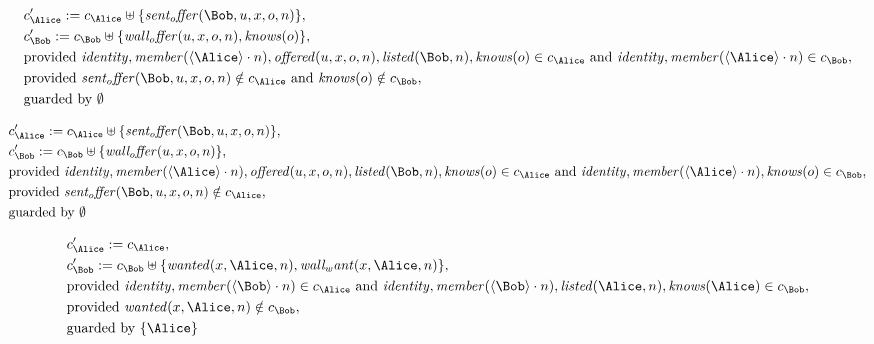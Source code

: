 \begin{align*}
&
c'_
{
\Alice
}
 := 
c_
{
\Alice
}
 \uplus 
\{
\mathit{
sent_offer
}
(
\Bob
,
u
,
x
,
o
,
n
)
\}
,\\
&
c'_
{
\Bob
}
 := 
c_
{
\Bob
}
 \uplus 
\{
\mathit{
wall_offer
}
(
u
,
x
,
o
,
n
)
,
\mathit{
knows
}
(
o
)
\}
,\\
&
\text{provided } 
\mathit{
identity
}
,
\mathit{
member
}
(
\langle
\Alice
\rangle
\cdot
n
)
,
\mathit{
offered
}
(
u
,
x
,
o
,
n
)
,
\mathit{
listed
}
(
\Bob
,
n
)
,
\mathit{
knows
}
(
o
)
 \in c_
{
\Alice
}
 \text{ and } 
\mathit{
identity
}
,
\mathit{
member
}
(
\langle
\Alice
\rangle
\cdot
n
)
 \in c_
{
\Bob
}
,\\
&
\text{provided } 
\mathit{
sent_offer
}
(
\Bob
,
u
,
x
,
o
,
n
)
 \notin c_
{
\Alice
}
 \text{ and } 
\mathit{
knows
}
(
o
)
 \notin c_
{
\Bob
}
,\\
&
\text{guarded by } \emptyset
\end{align*}

\begin{align*}
&
c'_
{
\Alice
}
 := 
c_
{
\Alice
}
 \uplus 
\{
\mathit{
sent_offer
}
(
\Bob
,
u
,
x
,
o
,
n
)
\}
,\\
&
c'_
{
\Bob
}
 := 
c_
{
\Bob
}
 \uplus 
\{
\mathit{
wall_offer
}
(
u
,
x
,
o
,
n
)
\}
,\\
&
\text{provided } 
\mathit{
identity
}
,
\mathit{
member
}
(
\langle
\Alice
\rangle
\cdot
n
)
,
\mathit{
offered
}
(
u
,
x
,
o
,
n
)
,
\mathit{
listed
}
(
\Bob
,
n
)
,
\mathit{
knows
}
(
o
)
 \in c_
{
\Alice
}
 \text{ and } 
\mathit{
identity
}
,
\mathit{
member
}
(
\langle
\Alice
\rangle
\cdot
n
)
,
\mathit{
knows
}
(
o
)
 \in c_
{
\Bob
}
,\\
&
\text{provided } 
\mathit{
sent_offer
}
(
\Bob
,
u
,
x
,
o
,
n
)
 \notin c_
{
\Alice
}
,\\
&
\text{guarded by } \emptyset
\end{align*}

\begin{align*}
&
c'_
{
\Alice
}
 := 
c_
{
\Alice
}
,\\
&
c'_
{
\Bob
}
 := 
c_
{
\Bob
}
 \uplus 
\{
\mathit{
wanted
}
(
x
,
\Alice
,
n
)
,
\mathit{
wall_want
}
(
x
,
\Alice
,
n
)
\}
,\\
&
\text{provided } 
\mathit{
identity
}
,
\mathit{
member
}
(
\langle
\Bob
\rangle
\cdot
n
)
 \in c_
{
\Alice
}
 \text{ and } 
\mathit{
identity
}
,
\mathit{
member
}
(
\langle
\Bob
\rangle
\cdot
n
)
,
\mathit{
listed
}
(
\Alice
,
n
)
,
\mathit{
knows
}
(
\Alice
)
 \in c_
{
\Bob
}
,\\
&
\text{provided } 
\mathit{
wanted
}
(
x
,
\Alice
,
n
)
 \notin c_
{
\Bob
}
,\\
&
\text{guarded by } \{
\Alice
\}
\end{align*}
